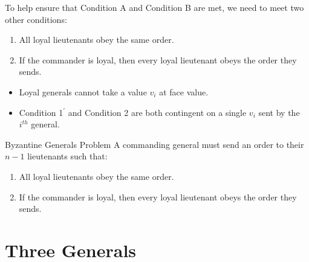 \documentclass{beamer}
\theoremstyle{conjecture1}
\theoremstyle{conjecture2}
\begin{document}
\begin{frame}
    To help ensure that Condition A and Condition B are met, we need to meet two other conditions:
    \begin{enumerate}[label={IC\arabic{enumi}.}]
        \item<2-> All loyal lieutenants obey the same order.
        \item<3-> If the commander is loyal, then every loyal lieutenant obeys the order they sends.
    \end{enumerate} 
\end{frame}

\begin{frame}
    \begin{itemize}[label={$\bullet$.}]
        \item Loyal generals cannot take a value $v_i$ at face value.
        \item<2-> {
            Condition 1$^\prime$ and Condition 2 are both contingent on a single $v_i$ sent by the $i^{th}$
            general.
        } 
    \end{itemize}
\end{frame}

\begin{frame}
    \begin{block}{Byzantine Generals Problem}
         {A commanding general must send an order to their $n - 1$ lieutenants such that:}

         {
            \begin{enumerate}[label={IC\arabic{enumi}.}]
                \item<3-> All loyal lieutenants obey the same order.
                \item<4-> If the commander is loyal, then every loyal lieutenant obeys the order they sends.
            \end{enumerate}
        }
    \end{block}
\end{frame}


\section{Three Generals}

\begin{frame}
    
\end{frame}
\end{document}
